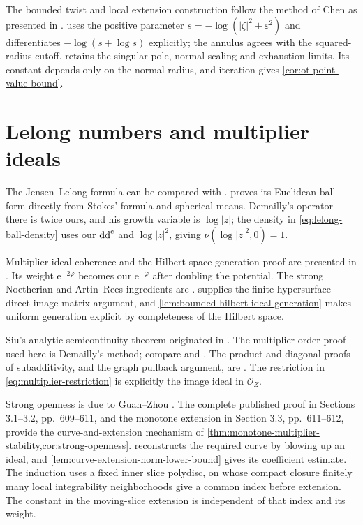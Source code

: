 The bounded twist and local extension construction follow the method of Chen as presented in \cite[Theorems 9.1--9.3 and Lemma 9.4, pp.~46--48]{Blo14SCV}.  uses the positive parameter $s=-\log(|\zeta|^2+\varepsilon^2)$ and differentiates $-\log(s+\log s)$ explicitly; the annulus agrees with the squared-radius cutoff.  retains the singular pole, normal scaling and exhaustion limits. Its constant depends only on the normal radius, and iteration gives \cref{cor:ot-point-value-bound}.

\section{Lelong numbers and multiplier ideals}
\label{sec:history-lelong-multiplier}
The Jensen--Lelong formula can be compared with \cite[Chapter III, (6.1)--(6.11), pp.~162--166]{DemBook}.  proves its Euclidean ball form directly from Stokes' formula and spherical means. Demailly's operator there is twice ours, and his growth variable is $\log|z|$; the density in \eqref{eq:lelong-ball-density} uses our $\mathrm{dd}^{\mathrm{c}}$ and $\log|z|^2$, giving $\nu(\log|z|^2,0)=1$.

Multiplier-ideal coherence and the Hilbert-space generation proof are presented in \cite[Proposition 5.7, pp.~36--37]{DemAnalyticOnline}. Its weight $\mathrm e^{-2\varphi}$ becomes our $\mathrm e^{-\varphi}$ after doubling the potential. The strong Noetherian and Artin--Rees ingredients are \cite[Chapter II, (3.22), p.~90, and Chapter IX, (1.1)--(1.3), pp.~403--404]{DemBook}.  supplies the finite-hypersurface direct-image matrix argument, and \cref{lem:bounded-hilbert-ideal-generation} makes uniform generation explicit by completeness of the Hilbert space.

Siu's analytic semicontinuity theorem originated in \cite{Siu74}. The multiplier-order proof used here is Demailly's method; compare \cite[Corollary 14.3, p.~138]{DemAnalyticOnline} and \cite[Theorem 10.2 and Lemma 10.3, p.~42]{Bou23Notes}. The product and diagonal proofs of subadditivity, and the graph pullback argument, are \cite[(15.1)--(15.3), pp.~158--159]{DemAnalyticOnline}. The restriction in \eqref{eq:multiplier-restriction} is explicitly the image ideal in $\mathcal O_Z$.

Strong openness is due to Guan--Zhou \cite{GZ15Strong}. The complete published proof in Sections 3.1--3.2, pp.~609--611, and the monotone extension in Section 3.3, pp.~611--612, provide the curve-and-extension mechanism of \cref{thm:monotone-multiplier-stability,cor:strong-openness}.  reconstructs the required curve by blowing up an ideal, and \cref{lem:curve-extension-norm-lower-bound} gives its coefficient estimate. The induction uses a fixed inner slice polydisc, on whose compact closure finitely many local integrability neighborhoods give a common index before extension. The constant in the moving-slice extension is independent of that index and its weight.


